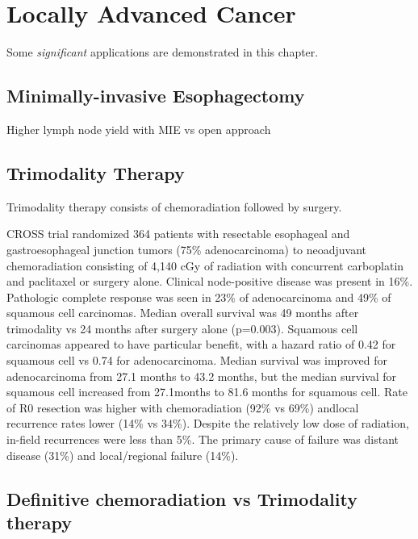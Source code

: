 \documentclass[
]{book}
\begin{document}
\hypertarget{locally-advanced-cancer}{%
\chapter{Locally Advanced Cancer}\label{locally-advanced-cancer}}

Some \emph{significant} applications are demonstrated in this chapter.

\hypertarget{minimally-invasive-esophagectomy-1}{%
\section{Minimally-invasive Esophagectomy}\label{minimally-invasive-esophagectomy-1}}

Higher lymph node yield with MIE vs open approach \citep{kalffLongTermSurvivalMinimally2020}

\hypertarget{trimodality-therapy}{%
\section{Trimodality Therapy}\label{trimodality-therapy}}

Trimodality therapy consists of chemoradiation followed by surgery.

CROSS trial randomized 364 patients with resectable esophageal and gastroesophageal junction tumors (75\% adenocarcinoma) to neoadjuvant chemoradiation consisting of 4,140 cGy of radiation with concurrent carboplatin and paclitaxel or surgery alone.\citep{vanhagen2074} Clinical node-positive disease was present in 16\%. Pathologic complete response was seen in 23\% of adenocarcinoma and 49\% of squamous cell carcinomas. Median overall survival was 49 months after trimodality vs 24 months after surgery alone (p=0.003). Squamous cell carcinomas appeared to have particular benefit, with a hazard ratio of 0.42 for squamous cell vs 0.74 for adenocarcinoma. Median survival was improved for adenocarcinoma from 27.1 months to 43.2 months, but the median survival for squamous cell increased from 27.1months to 81.6 months for squamous cell. Rate of R0 resection was higher with chemoradiation (92\% vs 69\%) andlocal recurrence rates lower (14\% vs 34\%). Despite the relatively low dose of radiation, in-field recurrences were less than 5\%. The primary cause of failure was distant disease (31\%) and local/regional failure (14\%).\citep{oppedijk385}

\hypertarget{definitive-chemoradiation-vs-trimodality-therapy}{%
\section{Definitive chemoradiation vs Trimodality therapy}\label{definitive-chemoradiation-vs-trimodality-therapy}}
\end{document}
